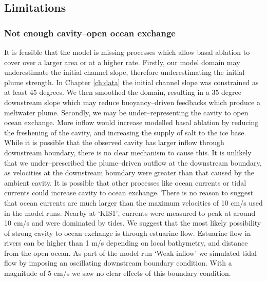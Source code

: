 \subsection{Limitations}

\subsubsection{Not enough cavity--open ocean exchange}
It is feasible that the model is missing processes which allow basal ablation to cover over a larger area or at a higher rate. 
Firstly, our model domain may underestimate the initial channel slope, therefore underestimating the initial plume strength. In Chapter \ref{ch:data} the initial channel slope was constrained as at least 45 degrees. We then smoothed the domain, resulting in a 35 degree downstream slope which may reduce buoyancy--driven feedbacks which produce a meltwater plume. 
Secondly, we may be under--representing the cavity to open ocean exchange. More inflow would increase modelled basal ablation by reducing the freshening of the cavity, and increasing the supply of salt to the ice base. While it is possible that the observed cavity has larger inflow through downstream boundary, there is no clear  mechanism to cause this. It is unlikely that we under--prescribed the plume--driven outflow at the downstream boundary, as velocities at the downstream boundary were greater than that caused by the ambient cavity. It is possible that other processes like ocean currents or tidal currents could increase cavity to ocean exchange. 
There is no reason to suggest that ocean currents are much larger than the maximum velocities of 10 cm/s used in the model runs. Nearby at `KIS1', currents were measured to peak at around 10 cm/s and were dominated by tides. 
We suggest that the most likely possibility of strong cavity to ocean exchange is through estuarine flow. Estuarine flow in rivers can be higher than 1 m/s \citep{nepf1996intratidal} depending on local bathymetry, and distance from the open ocean. As part of the model run `Weak inflow' we simulated tidal flow by imposing an oscillating downstream boundary condition. With a magnitude of 5 cm/s we saw no clear effects of this boundary condition. 

